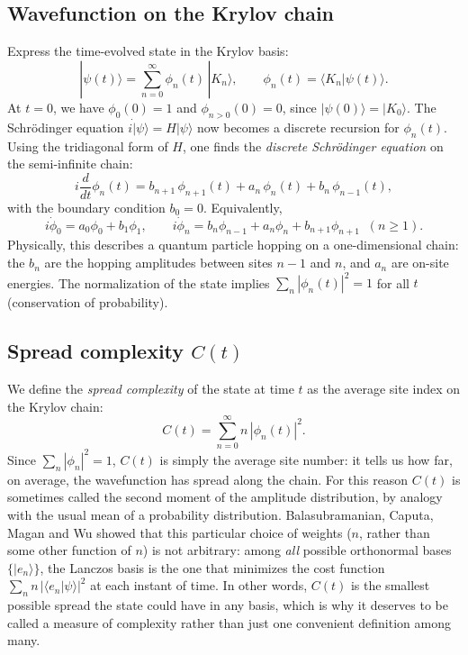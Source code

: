 \documentclass[11pt]{article}
\begin{document}
\subsection{Wavefunction on the Krylov chain}

Express the time-evolved state in the Krylov basis:
\begin{equation*}
|\psi(t)\rangle = \sum_{n=0}^\infty \phi_n(t)\,|K_n\rangle,
\qquad
\phi_n(t) = \langle K_n|\psi(t)\rangle.
\end{equation*}
At $t=0$, we have $\phi_0(0)=1$ and $\phi_{n>0}(0)=0$, since $|\psi(0)\rangle=|K_0\rangle$.  The Schrödinger equation $i\dot|\psi\rangle=H|\psi\rangle$ now becomes a discrete recursion for $\phi_n(t)$.  Using the tridiagonal form of $H$, one finds the \emph{discrete Schrödinger equation} on the semi-infinite chain:
\begin{equation*}
i\frac{d}{dt}\phi_n(t) 
= b_{n+1}\,\phi_{n+1}(t) + a_n\,\phi_n(t) + b_n\,\phi_{n-1}(t),
\end{equation*}
with the boundary condition $b_0=0$.  Equivalently,
\begin{equation*}
i\dot\phi_0 = a_0 \phi_0 + b_1 \phi_1,\qquad
i\dot\phi_n = b_n \phi_{n-1} + a_n\phi_n + b_{n+1}\phi_{n+1}\;\; (n\ge1).
\end{equation*}
Physically, this describes a quantum particle hopping on a one-dimensional chain: the $b_n$ are the hopping amplitudes between sites $n-1$ and $n$, and $a_n$ are on-site energies.  The normalization of the state implies $\sum_n |\phi_n(t)|^2=1$ for all $t$ (conservation of probability).

\subsection{Spread complexity $C(t)$}

We define the \emph{spread complexity} of the state at time $t$ as the average site index on the Krylov chain:
\begin{equation*}
C(t)=\sum_{n=0}^\infty n\,|\phi_n(t)|^2.
\end{equation*}
Since $\sum_n|\phi_n|^2=1$, $C(t)$ is simply the average site number: it tells us how far, on average, the wavefunction has spread along the chain. For this reason $C(t)$ is sometimes called the second moment of the amplitude distribution, by analogy with the usual mean of a probability distribution. Balasubramanian, Caputa, Magan and Wu \cite{Balasubramanian:2022tpr} showed that this particular choice of weights ($n$, rather than some other function of $n$) is not arbitrary: among \emph{all} possible orthonormal bases $\{|e_n\rangle\}$, the Lanczos basis is the one that minimizes the cost function $\sum_n n\,|\langle e_n|\psi\rangle|^2$ at each instant of time. In other words, $C(t)$ is the smallest possible spread the state could have in any basis, which is why it deserves to be called a measure of complexity rather than just one convenient definition among many.
\end{document}
